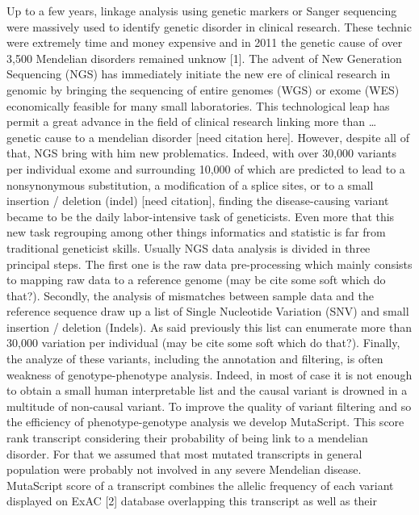 \documentclass[12pt,twoside]{reedthesis}
\theoremstyle{definition}
\theoremstyle{definition}
\theoremstyle{remark}
\begin{document}
  Up to a few years, linkage analysis using genetic markers or Sanger
  sequencing were massively used to identify genetic disorder in clinical
  research. These technic were extremely time and money expensive and in
  2011 the genetic cause of over 3,500 Mendelian disorders remained unknow
  {[}1{]}. The advent of New Generation Sequencing (NGS) has immediately
  initiate the new ere of clinical research in genomic by bringing the
  sequencing of entire genomes (WGS) or exome (WES) economically feasible
  for many small laboratories. This technological leap has permit a great
  advance in the field of clinical research linking more than \ldots{}
  genetic cause to a mendelian disorder {[}need citation here{]}. However,
  despite all of that, NGS bring with him new problematics. Indeed, with
  over 30,000 variants per individual exome and surrounding 10,000 of
  which are predicted to lead to a nonsynonymous substitution, a
  modification of a splice sites, or to a small insertion / deletion
  (indel) {[}need citation{]}, finding the disease-causing variant became
  to be the daily labor-intensive task of geneticists. Even more that this
  new task regrouping among other things informatics and statistic is far
  from traditional geneticist skills. Usually NGS data analysis is divided
  in three principal steps. The first one is the raw data pre-processing
  which mainly consists to mapping raw data to a reference genome (may be
  cite some soft which do that?). Secondly, the analysis of mismatches
  between sample data and the reference sequence draw up a list of Single
  Nucleotide Variation (SNV) and small insertion / deletion (Indels). As
  said previously this list can enumerate more than 30,000 variation per
  individual (may be cite some soft which do that?). Finally, the analyze
  of these variants, including the annotation and filtering, is often
  weakness of genotype-phenotype analysis. Indeed, in most of case it is
  not enough to obtain a small human interpretable list and the causal
  variant is drowned in a multitude of non-causal variant. To improve the
  quality of variant filtering and so the efficiency of phenotype-genotype
  analysis we develop MutaScript. This score rank transcript considering
  their probability of being link to a mendelian disorder. For that we
  assumed that most mutated transcripts in general population were
  probably not involved in any severe Mendelian disease. MutaScript score
  of a transcript combines the allelic frequency of each variant displayed
  on ExAC {[}2{]} database overlapping this transcript as well as their
\end{document}
